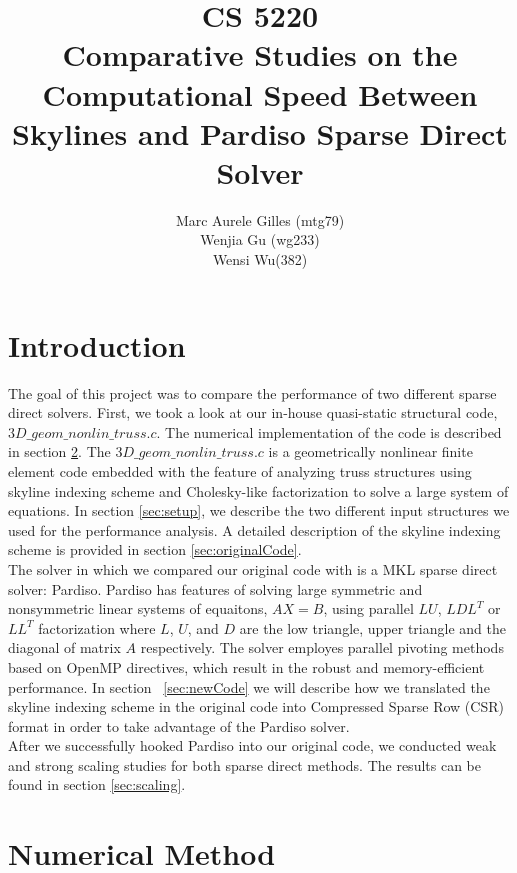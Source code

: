 \documentclass[11pt]{article}
\begin{document}
\title{CS 5220\\ Comparative Studies on the Computational Speed Between Skylines and Pardiso Sparse Direct Solver}
\author{Marc Aurele Gilles (mtg79)\\ Wenjia Gu (wg233)\\Wensi Wu(382) }
\maketitle

\section{Introduction}\label{sec:intro}

The goal of this project was to compare the performance of two different sparse direct solvers. First, we took a look at our in-house quasi-static structural code, $3D\_geom\_nonlin\_truss.c$. The numerical implementation of the code is described in section \ref{sec:method}.  The $3D\_geom\_nonlin\_truss.c $ is a geometrically nonlinear finite element code embedded with the feature of analyzing truss structures using skyline indexing scheme and Cholesky-like factorization to solve a large system of equations. In section \ref{sec:setup}, we describe the two different input structures we used for the performance analysis.  A detailed description of the skyline indexing scheme is provided in section \ref{sec:originalCode}. \\

The solver in which we compared our original code with is a MKL sparse direct solver: Pardiso. Pardiso has features of solving large symmetric and nonsymmetric linear systems of equaitons, $AX=B$, using parallel $LU$, $LDL^T$ or $LL^T$ factorization where $L$, $U$, and $D$ are the low triangle, upper triangle and the diagonal of matrix $A$ respectively. The solver employes parallel pivoting methods based on OpenMP directives, which result in the robust and memory-efficient performance. In section ~\ref{sec:newCode} we will describe how we translated the skyline indexing scheme in the original code into Compressed Sparse Row (CSR) format in order to take advantage of the Pardiso solver.\\

After we successfully hooked Pardiso into our original code, we conducted weak and strong scaling studies for both sparse direct methods. The results can be found in section \ref{sec:scaling}.  


\section{Numerical Method}\label{sec:method}
\end{document}
